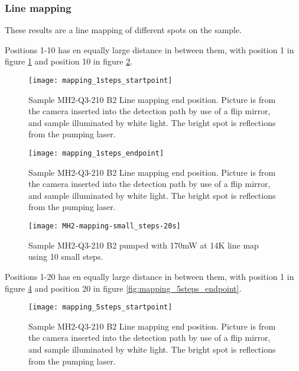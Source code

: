 \subsubsection{Line mapping}

These results are a line mapping of different spots on the sample.

Positions 1-10 has en equally large distance in between them, with position 1 in figure \ref{fig:mapping_1steps_startpoint} and position 10 in figure \ref{fig:mapping_1steps_endpoint}.

\begin{figure}[H]
\centering
\texttt{[image: mapping\_1steps\_startpoint]}
\caption[MH2-Q3-210 line mapping start position]{Sample MH2-Q3-210 B2 Line mapping end position. Picture is from the camera inserted into the detection path by use of a flip mirror, and sample illuminated by white light. The bright spot is reflections from the pumping laser.}
\label{fig:mapping_1steps_startpoint}%
\end{figure}


\begin{figure}[H]
\centering
\texttt{[image: mapping\_1steps\_endpoint]}
\caption[MH2-Q3-210 line mapping end position]{Sample MH2-Q3-210 B2 Line mapping end position. Picture is from the camera inserted into the detection path by use of a flip mirror, and sample illuminated by white light. The bright spot is reflections from the pumping laser.}
\label{fig:mapping_1steps_endpoint}%
\end{figure}

\begin{figure}[H]
\centering
\texttt{[image: MH2-mapping-small\_steps-20s]}
\caption[MH2-Q3-210 line mapping]{Sample MH2-Q3-210 B2 pumped with 170mW at 14K line map using 10 small steps.}
\label{fig:MH2-mapping-small_steps-20s}%
\end{figure}






Positions 1-20 has en equally large distance in between them, with position 1 in figure \ref{fig:mapping_5steps_startpoint} and position 20 in figure \ref{fig:mapping_5steps_endpoint}.

\begin{figure}[H]
\centering
\texttt{[image: mapping\_5steps\_startpoint]}
\caption[MH2-Q3-210 line mapping start position]{Sample MH2-Q3-210 B2 Line mapping end position. Picture is from the camera inserted into the detection path by use of a flip mirror, and sample illuminated by white light. The bright spot is reflections from the pumping laser.}
\label{fig:mapping_5steps_startpoint}%
\end{figure}


